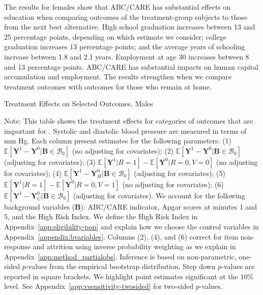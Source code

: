 The results for females show that ABC/CARE has substantial effects on education when comparing outcomes of the treatment-group subjects to those from the next best alternative. High school graduation increases between 13 and 25 percentage points, depending on which estimate we consider; college graduation increases 13 percentage points; and the average years of schooling increase between 1.8 and 2.1 years. Employment at age 30 increases between 8 and 13 percentage points. ABC/CARE has substantial impacts on human capital accumulation and employment. The results strengthen when we compare treatment outcomes with outcomes for those who remain at home.

\begin{table}
\centering
\begin{threeparttable}
\caption{Treatment Effects on Selected Outcomes, Males}\label{table:tescombinedmales}
\begin{scriptsize}

\end{scriptsize}
\begin{tablenotes}
\scriptsize
Note: This table shows the treatment effects for categories of outcomes that are important for \citet{Garcia_Heckman_Leaf_etal_2017_Comp_CBA_Unpublished}. Systolic and diastolic blood pressure are measured in terms of mm Hg. Each column present estimates for the following parameters: (1) $\mathbb{E} \left [ \bm{Y}^1 -  \bm{Y}^0 | \bm{B} \in \mathcal{B}_{0} \right]$ (no adjusting for covariates); (2) $\mathbb{E} \left [ \bm{Y}^1 -  \bm{Y}^0 | \bm{B} \in \mathcal{B}_{0} \right]$ (adjusting for covariates); (3) $\mathbb{E} \left [ \bm{Y}^1 | R = 1 \right] -  \mathbb{E} \left [ \bm{Y}^0 | R = 0,V = 0  \right]$ (no adjusting for covariates); (4) $\mathbb{E} \left [ \bm{Y}^1 -  \bm{Y}_H^0 | \bm{B} \in \mathcal{B}_{0} \right]$ (adjusting for covariates); (5) $\mathbb{E} \left [ \bm{Y}^1 | R = 1 \right] -  \mathbb{E} \left [ \bm{Y}^0 | R = 0,V = 1 \right]$ (no adjusting for covariates); (6) $\mathbb{E} \left [ \bm{Y}^1 -  \bm{Y}_C^0 | \bm{B} \in \mathcal{B}_{0} \right]$ (adjusting for covariates). We account for the following background variables ($\bm{B}$): ABC/CARE indicator, Apgar scores at minutes 1 and 5, and the High Risk Index. We define the High Risk Index in Appendix~\ref{app:eligibility-pop} and explain how we choose the control variables in Appendix~\ref{appendix:bvariables}. Columns (2), (4), and (6) correct for item non-response and attrition using inverse probability weighting as we explain in Appendix~\ref{app:method_partialobs}. Inference is based on non-parametric, one-sided $p$-values from the empirical bootstrap distribution. Step down $p$-values are reported in square brackets. We highlight point estimates significant at the $10\%$ level. See Appendix~\ref{app:vsensitivity-twosided} for two-sided $p$-values.\\
\end{tablenotes}
\end{threeparttable}
\end{table}
\doublespacing

